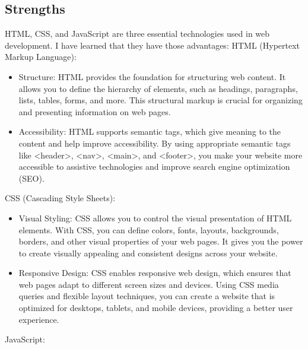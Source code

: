 \documentclass[a4paper, 11pt]{report}
\begin{document}
\subsection{Strengths}
HTML, CSS, and JavaScript are three essential technologies used in web development. I have learned that they have those advantages:
HTML (Hypertext Markup Language):
\begin{itemize}
\item 	Structure: HTML provides the foundation for structuring web content. It allows you to define the hierarchy of elements, such as headings, paragraphs, lists, tables, forms, and more. This structural markup is crucial for organizing and presenting information on web pages.
\item 	Accessibility: HTML supports semantic tags, which give meaning to the content and help improve accessibility. By using appropriate semantic tags like <header>, <nav>, <main>, and <footer>, you make your website more accessible to assistive technologies and improve search engine optimization (SEO).
\end{itemize}
CSS (Cascading Style Sheets):
\begin{itemize}
\item 	Visual Styling: CSS allows you to control the visual presentation of HTML elements. With CSS, you can define colors, fonts, layouts, backgrounds, borders, and other visual properties of your web pages. It gives you the power to create visually appealing and consistent designs across your website.
\item 	Responsive Design: CSS enables responsive web design, which ensures that web pages adapt to different screen sizes and devices. Using CSS media queries and flexible layout techniques, you can create a website that is optimized for desktops, tablets, and mobile devices, providing a better user experience.
\end{itemize}
JavaScript:
\end{document}
